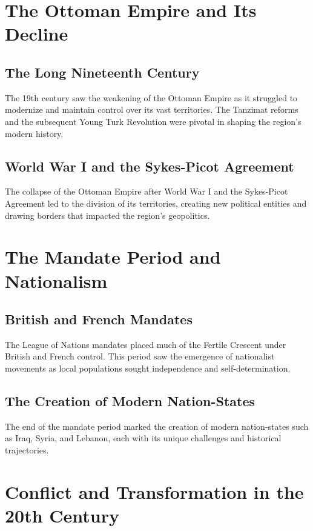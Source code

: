 \documentclass{book}
\begin{document}
\section{The Ottoman Empire and Its Decline}
\label{sec:ottoman-empire}

\subsection{The Long Nineteenth Century}
The 19th century saw the weakening of the Ottoman Empire as it struggled to modernize and maintain control over its vast territories. The Tanzimat reforms and the subsequent Young Turk Revolution were pivotal in shaping the region's modern history.

\subsection{World War I and the Sykes-Picot Agreement}
The collapse of the Ottoman Empire after World War I and the Sykes-Picot Agreement led to the division of its territories, creating new political entities and drawing borders that impacted the region's geopolitics.

\section{The Mandate Period and Nationalism}
\label{sec:mandate-nationalism}

\subsection{British and French Mandates}
The League of Nations mandates placed much of the Fertile Crescent under British and French control. This period saw the emergence of nationalist movements as local populations sought independence and self-determination.

\subsection{The Creation of Modern Nation-States}
The end of the mandate period marked the creation of modern nation-states such as Iraq, Syria, and Lebanon, each with its unique challenges and historical trajectories.

\section{Conflict and Transformation in the 20th Century}
\label{sec:conflict-transformation}
\end{document}

